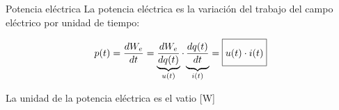 \documentclass[aspectratio=169, xcolor={usenames,svgnames,dvipsnames}]{beamer}
\begin{document}

\begin{frame}{Potencia eléctrica}
    La \alert{potencia eléctrica} es la variación del trabajo del campo eléctrico por unidad de tiempo:
    
    \vspace{4mm}
    \begin{equation*}
      p(t)=\frac{dW_{e}}{dt}= \underbrace{\dfrac{dW_e}{dq(t)}}_{u(t)} \cdot \underbrace{\vphantom{\dfrac{dW_e}{dq(t)}} \dfrac{dq(t)}{dt}}_{i(t)} = \boxed{\vphantom{\dfrac{dq(t)}{dt}}  u(t) \cdot i(t)}
    \end{equation*}
    
    \vspace{4mm}
    La \alert{unidad} de la potencia eléctrica es el \alert{vatio} [W]
\end{frame}

\end{document}
